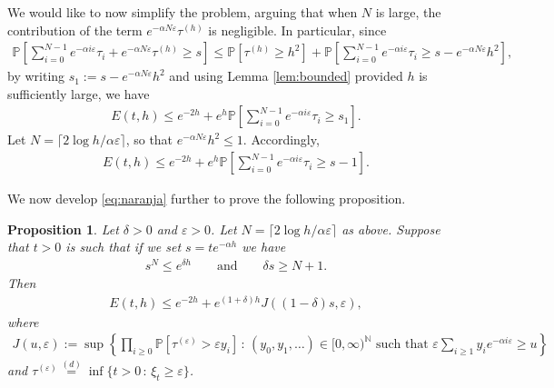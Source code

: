 \documentclass[a4,12pt]{amsart}
\numberwithin{equation}{section}
\newtheorem{proposition}[thm]{Proposition}
\begin{document}
    We would like to now simplify the problem, arguing that when $N$ is large, the contribution of the term $ e^{- \alpha N\varepsilon} \tau^{(h)} $ is negligible. 
	In particular, since 
	\begin{align*} 
	\mathbb{P} \left[\sum_{i = 0}^{N-1 } e^{ -\alpha i\varepsilon} \tau_i + e^{- \alpha N\varepsilon} \tau^{(h)} \geq s \right]
	\leq  
	\mathbb{P}\left[ \tau^{(h)} \geq h^2 \right] + 
	\mathbb{P} \left[\sum_{i = 0}^{N-1 } e^{ -\alpha i\varepsilon} \tau_i \geq s - e^{- \alpha N\varepsilon}  h^2\right],
	\end{align*}
	by writing $s_1 := s - e^{- \alpha N\varepsilon}  h^2$ and using Lemma \ref{lem:bounded} provided $h$ is sufficiently large, we have 
	\begin{align*} 
		E(t,h)  \leq 
		e^{-2h} + 
		e^h \mathbb{P} \left[\sum_{i = 0}^{N-1 } e^{ -\alpha i\varepsilon} \tau_i \geq s_1 \right].
	\end{align*}
    Let $N = \lceil 2\log h/\alpha \varepsilon \rceil$, so that $e^{ - \alpha N \varepsilon} h^2 \leq 1$. Accordingly,
	\begin{align} \label{eq:naranja}
		E(t,h)  \leq 
		e^{-2h} + 
		e^h \mathbb{P} \left[\sum_{i = 0}^{N-1 } e^{ -\alpha i\varepsilon} \tau_i \geq s-1 \right].
	\end{align}
    
We now develop \eqref{eq:naranja} further to prove the following proposition.


	\begin{proposition} \label{prop:genupper}
		Let $\delta > 0$ and $\varepsilon > 0$. 
		Let $N = \lceil 2\log h/\alpha \varepsilon \rceil$ as above. Suppose that $t > 0$ is such that if we set $s = t e^{ - \alpha h}$ we have 
        \begin{align}\label{eq:condition_s}
        s^N \leq e^{ \delta h} \qquad \text{and} \qquad \delta s \geq N+1.
        \end{align}
		Then 
		\begin{align*}
			E(t,h) \leq e^{-2h} + e^{(1+\delta)h} J((1-\delta)s,\varepsilon),
		\end{align*}
		where
		\begin{align*}
			J(u,\varepsilon) := 
			\sup \left\{ \prod_{i \geq 0} \mathbb{P} \left[ \tau^{(\varepsilon)} >\varepsilon y_i \right] 
			\,:\, (y_0,y_1,\ldots)\in[0,\infty)^{\mathbb{N}} \mbox{ such that } \varepsilon \sum_{i \geq 1} y_i e^{ - \alpha i \varepsilon } \geq u \right\} 
\end{align*}
		and $\tau^{(\varepsilon)} \overset{(d)}{=} \inf\{ t > 0 \,:\, \xi_t \geq \varepsilon \}$. 
	\end{proposition}
\end{document}
